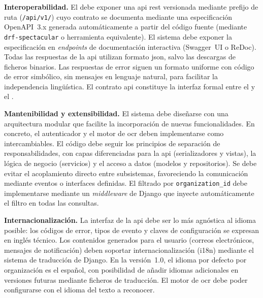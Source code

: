 \item \textbf{Interoperabilidad.} \label{rnf:interop}
El  debe exponer una \acs{api} \acs{rest} versionada mediante prefijo de ruta
(\texttt{/api/v1/}) cuyo contrato se documenta mediante una especificación OpenAPI~3.x
generada automáticamente a partir del código fuente (mediante \texttt{drf-spectacular} o
herramienta equivalente). El sistema debe exponer la especificación en \textit{endpoints}
de documentación interactiva (Swagger~UI o ReDoc). Todas las respuestas de la \acs{api}
utilizan formato \acs{json}, salvo las descargas de ficheros binarios. Las respuestas de
error siguen un formato uniforme con código de error simbólico, sin mensajes en lenguaje
natural, para facilitar la independencia lingüística. El contrato \acs{api} constituye la
interfaz formal entre el  y el .

\item \textbf{Mantenibilidad y extensibilidad.} \label{rnf:maintainability}
El sistema debe diseñarse con una arquitectura modular que facilite la incorporación de
nuevas funcionalidades. En concreto, el autenticador y el motor de \acs{ocr} deben
implementarse como  intercambiables. El código debe seguir los principios de
separación de responsabilidades, con capas diferenciadas para la \acs{api} (serializadores
y vistas), la lógica de negocio (servicios) y el acceso a datos (modelos y repositorios).
Se debe evitar el acoplamiento directo entre subsistemas, favoreciendo la comunicación
mediante eventos o interfaces definidas. El filtrado  por
\texttt{organization\_id} debe implementarse mediante un \textit{middleware} de Django que
inyecte automáticamente el filtro en todas las consultas.

\item \textbf{Internacionalización.} \label{rnf:i18n}
La interfaz de la \acs{api} debe ser lo más agnóstica al idioma posible: los códigos de
error, tipos de evento y claves de configuración se expresan en inglés técnico. Los
contenidos generados para el usuario (correos electrónicos, mensajes de notificación) deben
soportar internacionalización (i18n) mediante el sistema de traducción de Django. En la
versión~1.0, el idioma por defecto por organización es el español, con posibilidad de añadir
idiomas adicionales en versiones futuras mediante ficheros de traducción. El motor de
\acs{ocr} debe poder configurarse con el idioma del texto a reconocer.

